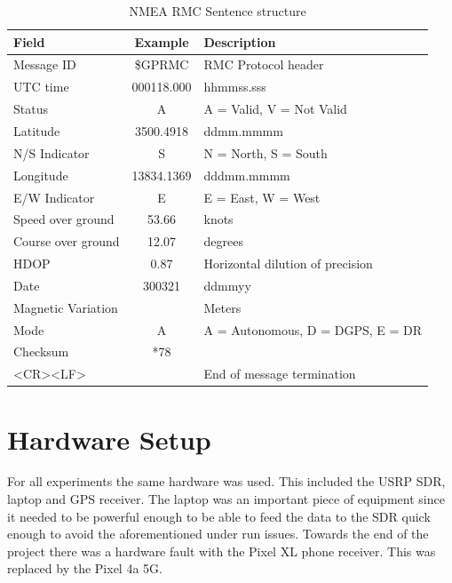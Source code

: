\renewcommand{\arraystretch}{1.5}
\begin{table}[!h]
    \begin{center}
        \caption{NMEA RMC Sentence structure}
        \label{tab:NMEA RMC Struct}
        \begin{tabular}{ |m{4cm}|c|p{6cm}| }
            \hline
            \textbf{Field} & \textbf{Example} & \textbf{Description} \\
            \hline
            Message ID & \$GPRMC & RMC Protocol header \\
            \hline
            UTC time & 000118.000 & hhmmss.sss \\
            \hline
            Status & A & A = Valid, V = Not Valid \\
            \hline
            Latitude & 3500.4918 & ddmm.mmmm\\
            \hline
            N/S Indicator & S & N = North, S = South\\
            \hline
            Longitude & 13834.1369 & dddmm.mmmm \\
            \hline
            E/W Indicator & E & E = East, W = West\\
            \hline
            Speed over ground & 53.66 & knots \\
            \hline
            Course over ground & 12.07 & degrees \\
            \hline
            HDOP & 0.87 & Horizontal dilution of precision\\
            \hline
            Date & 300321 & ddmmyy \\
            \hline
            Magnetic Variation &  & Meters \\
            \hline
            Mode & A & A = Autonomous, D = DGPS, E = DR \\
            \hline
            Checksum & *78 &  \\
            \hline
            <CR><LF> & & End of message termination \\
            \hline
        \end{tabular}
    \end{center}
\end{table}
\renewcommand{\arraystretch}{1}

\section{Hardware Setup}
For all experiments the same hardware was used. This included the USRP SDR, laptop and GPS receiver. The laptop was an important piece of equipment since it needed to be
powerful enough to be able to feed the data to the SDR quick enough to avoid the aforementioned under run issues. Towards the end of the project there was a hardware fault
with the Pixel XL phone receiver. This was replaced by the Pixel 4a 5G.

